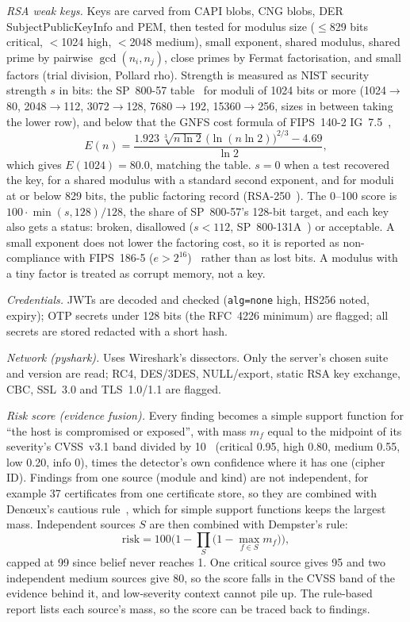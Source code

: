 \textit{RSA weak keys.} Keys are carved from CAPI blobs, CNG blobs, DER SubjectPublicKeyInfo and PEM, then
tested for modulus size ($\le$829 bits critical, $<$1024 high, $<$2048 medium), small exponent, shared
modulus, shared prime by pairwise $\gcd(n_i,n_j)$, close primes by Fermat factorisation, and small factors
(trial division, Pollard rho). Strength is measured as NIST security strength $s$ in bits: the SP~800-57
table~\cite{nist80057} for moduli of 1024 bits or more (1024$\to$80, 2048$\to$112, 3072$\to$128,
7680$\to$192, 15360$\to$256, sizes in between taking the lower row), and below that the GNFS cost formula
of FIPS~140-2 IG~7.5~\cite{fips140ig},
\begin{equation}
  E(n) = \frac{1.923\,\sqrt[3]{n\ln 2}\,\big(\ln(n\ln 2)\big)^{2/3} - 4.69}{\ln 2},
\end{equation}
which gives $E(1024)=80.0$, matching the table. $s=0$ when a test recovered the key, for a shared modulus
with a standard second exponent, and for moduli at or below 829 bits, the public factoring record
(RSA-250~\cite{boudot2020comparing}). The 0--100 score is $100\cdot\min(s,128)/128$, the share of SP~800-57's
128-bit target, and each key also gets a status: broken, disallowed ($s<112$, SP~800-131A~\cite{nist800131a})
or acceptable. A small exponent does not lower the factoring cost, so it is reported as non-compliance with
FIPS~186-5 ($e>2^{16}$)~\cite{fips1865} rather than as lost bits. A modulus with a tiny factor is treated as
corrupt memory, not a key.

\textit{Credentials.} JWTs are decoded and checked (\texttt{alg=none} high, HS256 noted, expiry);
OTP secrets under 128 bits (the RFC~4226 minimum) are flagged; all secrets are stored redacted with a short hash.

\textit{Network (pyshark).} Uses Wireshark's dissectors. Only the server's chosen suite and version are
read; RC4, DES/3DES, NULL/export, static RSA key exchange, CBC, SSL~3.0 and TLS~1.0/1.1 are flagged.

\textit{Risk score (evidence fusion).} Every finding becomes a simple support function for ``the host is
compromised or exposed'', with mass $m_f$ equal to the midpoint of its severity's CVSS~v3.1 band divided by
10~\cite{first2019cvss} (critical 0.95, high 0.80, medium 0.55, low 0.20, info 0), times the detector's own
confidence where it has one (cipher ID). Findings from one source (module and kind) are not independent, for
example 37 certificates from one certificate store, so they are combined with Den{\oe}ux's cautious
rule~\cite{denoeux2008conjunctive}, which for simple support functions keeps the largest mass. Independent
sources $S$ are then combined with Dempster's rule:
\begin{equation}
  \mathrm{risk} = 100\Big(1 - \prod_{S}\big(1 - \max_{f\in S} m_f\big)\Big),
\end{equation}
capped at 99 since belief never reaches 1. One critical source gives 95 and two independent medium sources
give 80, so the score falls in the CVSS band of the evidence behind it, and low-severity context cannot pile
up. The rule-based report lists each source's mass, so the score can be traced back to findings.

